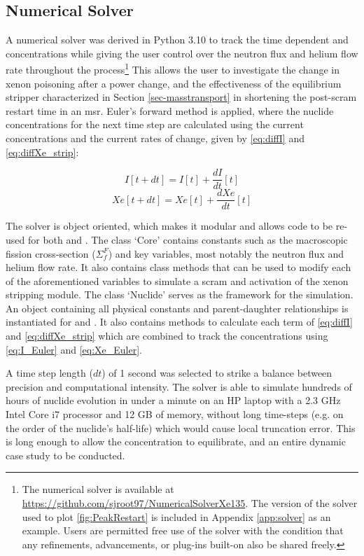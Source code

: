 \subsection{Numerical Solver} \label{sec-script}
A numerical solver was derived in Python 3.10 to track the time dependent \I and \Xe concentrations while giving the user control over the neutron flux and helium flow rate throughout the process\footnote{The numerical solver is available at \href{https://github.com/sjroot97/NumericalSolverXe135}{https://github.com/sjroot97/NumericalSolverXe135}. The version of the solver used to plot \cref{fig:PeakRestart} is included in Appendix \ref{app:solver} as an example. Users are permitted free use of the solver with the condition that any refinements, advancements, or plug-ins built-on also be shared freely.} This allows the user to investigate the change in xenon poisoning after a power change, and the effectiveness of the equilibrium stripper characterized in Section \ref{sec-masstransport} in shortening the post-scram restart time in an \acs{msr}. Euler's forward method is applied, where the nuclide concentrations for the next time step are calculated 
using the current concentrations and the current rates of change, given by \ref{eq:diffI} and \ref{eq:diffXe_strip}:

\begin{equation}\label{eq:I_Euler}
    I[t+dt]=I[t]+\frac{dI}{dt}[t]
\end{equation}
\begin{equation}\label{eq:Xe_Euler}
    Xe[t+dt]=Xe[t]+\frac{dXe}{dt}[t]
\end{equation}

The solver is object oriented, which makes it modular and allows code to be re-used for both \I and \Xe. The class `Core' contains constants such as the macroscopic fission cross-section ($\Sigma_f^F$) and key variables, most notably the neutron flux and helium flow rate. It also contains class methods that can be used to modify each of the aforementioned variables to simulate a scram and activation of the xenon stripping module. The class `Nuclide' serves as the framework for the simulation. An object containing all physical constants and parent-daughter relationships is instantiated for \I and \Xe. It also contains methods to calculate each term of \ref{eq:diffI} and \ref{eq:diffXe_strip} which are combined to track the concentrations using \ref{eq:I_Euler} and \ref{eq:Xe_Euler}.


A time step length ($dt$) of 1 second was selected to strike a balance between precision and computational intensity. The solver is able to simulate hundreds of hours of nuclide evolution in under a minute on an HP laptop with a 2.3 GHz Intel Core i7 processor and 12 GB of memory, without long time-steps (e.g. on the order of the nuclide's half-life) which would cause  local truncation error. This is long enough to allow the \Xe concentration to equilibrate, and an entire dynamic case study to be conducted.

